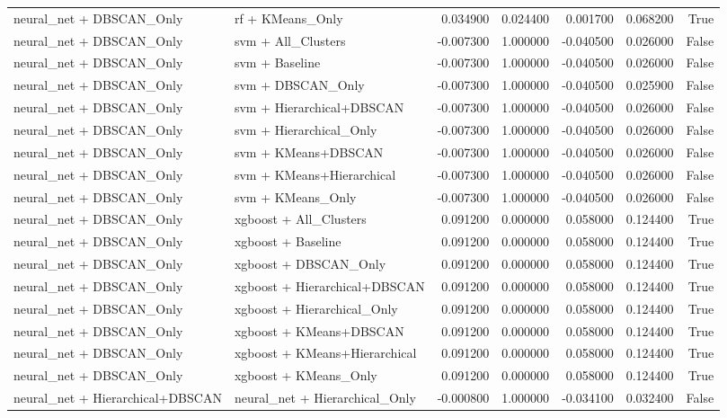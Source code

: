 \begin{tabular}{llrrrrr}
neural_net + DBSCAN_Only & rf + KMeans_Only & 0.034900 & 0.024400 & 0.001700 & 0.068200 & True \\
neural_net + DBSCAN_Only & svm + All_Clusters & -0.007300 & 1.000000 & -0.040500 & 0.026000 & False \\
neural_net + DBSCAN_Only & svm + Baseline & -0.007300 & 1.000000 & -0.040500 & 0.026000 & False \\
neural_net + DBSCAN_Only & svm + DBSCAN_Only & -0.007300 & 1.000000 & -0.040500 & 0.025900 & False \\
neural_net + DBSCAN_Only & svm + Hierarchical+DBSCAN & -0.007300 & 1.000000 & -0.040500 & 0.026000 & False \\
neural_net + DBSCAN_Only & svm + Hierarchical_Only & -0.007300 & 1.000000 & -0.040500 & 0.026000 & False \\
neural_net + DBSCAN_Only & svm + KMeans+DBSCAN & -0.007300 & 1.000000 & -0.040500 & 0.026000 & False \\
neural_net + DBSCAN_Only & svm + KMeans+Hierarchical & -0.007300 & 1.000000 & -0.040500 & 0.026000 & False \\
neural_net + DBSCAN_Only & svm + KMeans_Only & -0.007300 & 1.000000 & -0.040500 & 0.026000 & False \\
neural_net + DBSCAN_Only & xgboost + All_Clusters & 0.091200 & 0.000000 & 0.058000 & 0.124400 & True \\
neural_net + DBSCAN_Only & xgboost + Baseline & 0.091200 & 0.000000 & 0.058000 & 0.124400 & True \\
neural_net + DBSCAN_Only & xgboost + DBSCAN_Only & 0.091200 & 0.000000 & 0.058000 & 0.124400 & True \\
neural_net + DBSCAN_Only & xgboost + Hierarchical+DBSCAN & 0.091200 & 0.000000 & 0.058000 & 0.124400 & True \\
neural_net + DBSCAN_Only & xgboost + Hierarchical_Only & 0.091200 & 0.000000 & 0.058000 & 0.124400 & True \\
neural_net + DBSCAN_Only & xgboost + KMeans+DBSCAN & 0.091200 & 0.000000 & 0.058000 & 0.124400 & True \\
neural_net + DBSCAN_Only & xgboost + KMeans+Hierarchical & 0.091200 & 0.000000 & 0.058000 & 0.124400 & True \\
neural_net + DBSCAN_Only & xgboost + KMeans_Only & 0.091200 & 0.000000 & 0.058000 & 0.124400 & True \\
neural_net + Hierarchical+DBSCAN & neural_net + Hierarchical_Only & -0.000800 & 1.000000 & -0.034100 & 0.032400 & False \\

\end{tabular}
